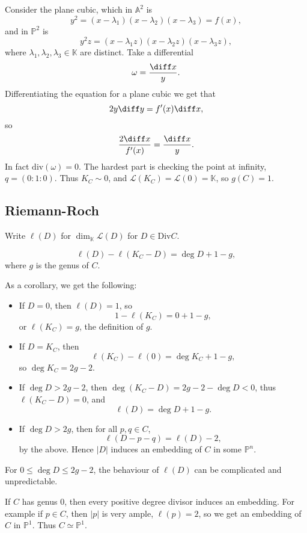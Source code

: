 \documentclass[12pt]{article}
\begin{document}
\begin{exbox}
	Consider the plane cubic, which in $\mathbb{A}^2$ is
	\[
	y^2 = (x - \lambda_1)(x-\lambda_2)(x-\lambda_3) = f(x),
	\]
	and in $\mathbb{P}^2$ is
	\[
	y^2 z = (x - \lambda_1z)(x - \lambda_2z)(x - \lambda_3z),
	\]
	where $\lambda_1, \lambda_2, \lambda_3 \in \mathbb{K}$ are distinct. Take a differential
	\[
	\omega = \frac{\diff x}{y}.
	\]
	Differentiating the equation for a plane cubic we get that
	\[
	2y \diff y = f'(x) \diff x,
	\]
	so
	\[
	\frac{2 \diff x}{f'(x)} = \frac{\diff x}{y}.
	\]
	In fact $\mathrm{div}(\omega) = 0$. The hardest part is checking the point at infinity, $q = (0 : 1 : 0)$. Thus $K_C \sim 0$, and $\mathcal{L}(K_C) = \mathcal{L}(0) = \mathbb{K}$, so $g(C) = 1$.
\end{exbox}

\subsection{Riemann-Roch}%
\label{sub:rr}

Write $\ell(D)$ for $\dim_{\mathbb{K}} \mathcal{L}(D)$ for $D \in \mathrm{Div}C$.

\begin{theorem}
	\[
	\ell(D) - \ell(K_C - D) = \deg D + 1 - g,
	\]
	where $g$ is the genus of $C$.
\end{theorem}

As a corollary, we get the following:
\begin{itemize}
	\item If $D = 0$, then $\ell(D) = 1$, so
	\[
	1 - \ell(K_C) = 0 + 1 - g,
	\]
	or $\ell(K_C) = g$, the definition of $g$.
	\item If $D = K_C$, then
		\[
		\ell(K_C) - \ell(0) = \deg K_C + 1 - g,
		\]
		so $\deg K_C = 2g - 2$.
	\item If $\deg D > 2g - 2$, then $\deg (K_C - D) = 2g - 2 - \deg D < 0$, thus $\ell(K_C - D) = 0$, and
		\[
		\ell(D) = \deg D + 1 - g.
		\]
	\item If $\deg D > 2g$, then for all $p, q \in C$,
		\[
		\ell(D - p - q) = \ell(D) - 2,
		\]
		by the above. Hence $|D|$ induces an embedding of $C$ in some $\mathbb{P}^n$.
\end{itemize}

\begin{remark}
	For $0 \leq \deg D \leq 2g - 2$, the behaviour of $\ell(D)$ can be complicated and unpredictable.
\end{remark}

\begin{exbox}
	If $C$ has genus 0, then every positive degree divisor induces an embedding. For example if $p \in C$, then $|p|$ is very ample, $\ell(p) = 2$, so we get an embedding of $C$ in $\mathbb{P}^1$. Thus $C \simeq \mathbb{P}^1$.
\end{exbox}
\end{document}
